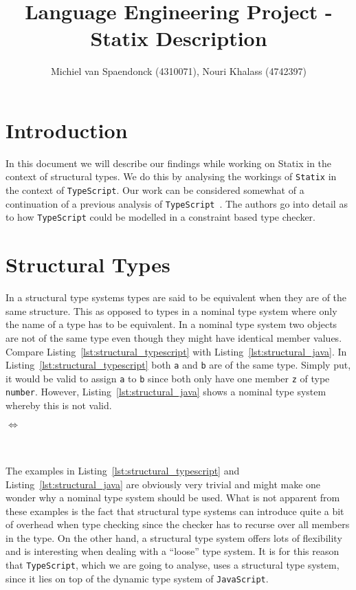 \documentclass{article}
\title{Language Engineering Project - Statix Description}
\author{Michiel van Spaendonck (4310071), Nouri Khalass (4742397)}
\newcommand{\ttt}[1]{\texttt{#1}}
\begin{document}
\maketitle

\section*{Introduction}
In this document we will describe our findings while working on Statix in the context of structural types.
We do this by analysing the workings of \texttt{Statix} in the context of \texttt{TypeScript}.
Our work can be considered somewhat of a continuation of a previous analysis of \texttt{TypeScript}~\cite{MetaTypeScript}.
The authors go into detail as to how \texttt{TypeScript} could be modelled in a constraint based type checker.

\section*{Structural Types}
In a structural type systems types are said to be equivalent when they are of the same structure.
This as opposed to types in a nominal type system where only the name of a type has to be equivalent.
In a nominal type system two objects are not of the same type even though they might have identical member values.
Compare Listing~\ref{lst:structural_typescript} with Listing~\ref{lst:structural_java}.
In Listing~\ref{lst:structural_typescript} both \ttt{a} and \ttt{b} are of the same type.
Simply put, it would be valid to assign \ttt{a} to \ttt{b} since both only have one member \ttt{z} of type \ttt{number}.
However, Listing~\ref{lst:structural_java} shows a nominal type system whereby this is not valid.

\noindent
\begin{minipage}{.45\textwidth}

\end{minipage}
\hfill$\Longleftrightarrow$\hfill\hfill\hfill
\begin{minipage}{.45\textwidth}

\end{minipage}
\\\\
The examples in Listing~\ref{lst:structural_typescript} and Listing~\ref{lst:structural_java} are obviously very trivial and might make one wonder why a nominal type system should be used.
What is not apparent from these examples is the fact that structural type systems can introduce quite a bit of overhead when type checking since the checker has to recurse over all members in the type.
On the other hand, a structural type system offers lots of flexibility and is interesting when dealing with a ``loose'' type system.
It is for this reason that \ttt{TypeScript}, which we are going to analyse, uses a structural type system, since it lies on top of the dynamic type system of \ttt{JavaScript}.
\end{document}
